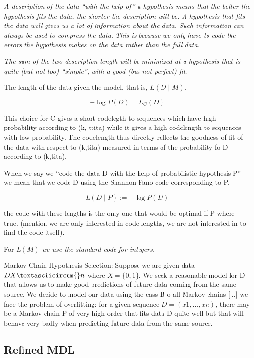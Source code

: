 {\emph{A description of the data ``with the help of'' a hypothesis
    means that the better the hypothesis fits the data, the shorter the
    description will be. A hypothesis that fits the data well gives us
    a lot of information about the data. Such information can always be
    used to compress the data. This is because we only have to code the
    errors the hypothesis makes on the data rather than the full data.}

\emph{The sum of the two description length will be minimized at a
    hypothesis that is quite (but not too) ``simple'', with a good (but
    not perfect) fit.}

The length of the data given the model, that is, \emph{$L(D\mid M)$.}

\[
    -\log P(D)=L_{C}(D)
\]


This choice for C gives a short codelegth to sequences which have
high probability according to (k, ttita) while it gives a high codelength
to sequences with low probability. The codelength thus directly reflects
the goodness-of-fit of the data with respect to (k,tita) measured
in terms of the probability fo D according to (k,tita).

When we say we ``code the data D with the help of probabilistic hypothesis
P'' we mean that we code D using the Shannon-Fano code corresponding
to P.

\[
    L(D\mid P):=-\log P(D)
\]


the code with these lengths is the only one that would be optimal
if P where true. (mention we are only interested in code lengths,
we are not interested in to find the code itself).

For \emph{$L(M)$ we use the standard code for integers.}

\begin{example}
    Markov Chain Hypothesis Selection: Suppose we are given data $D X\textasciicircum{}n$
    where $X=\{0,1\}$. We seek a reasonable model for D that allows us to
    make good predictions of future data coming from the same source.
    We decide to model our data using the cass B o all Markov chains ${[}...{]}$
    we face the problem of overfitting: for a given sequence $D=(x1,...,xn)$,
    there may be a Markov chain P of very high order that fits data D
    quite well but that will behave very badly when predicting future
    data from the same source.
\end{example}

\subsection{Refined MDL}

}
